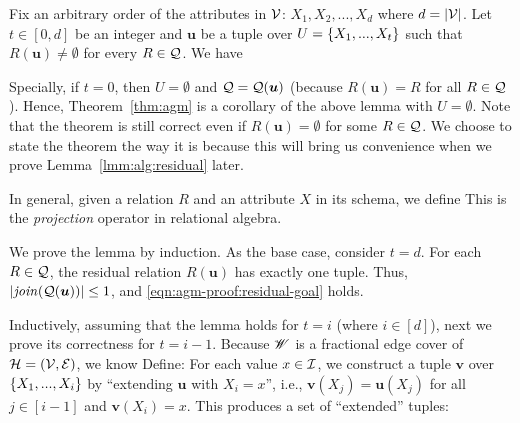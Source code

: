 \vslit

\begin{lemma} \label{lmm:agm-proof:residual}
    Fix an arbitrary order of the attributes in $\mathcal{V}$: $X_1, X_2, ..., X_d$ where $d = |\mathcal{V}|$. Let $t \in [0, d]$ be an integer and $\bm{u}$ be a tuple over $U = \{X_1, ..., X_t\}$ such that $R(\bm{u}) \ne \emptyset$ for every $R \in \mathcal{Q}$. We have
\end{lemma}

\vgap

Specially, if $t = 0$, then $U = \emptyset$ and $\mathcal{Q} = \mathcal{Q}(\textrm{\boldmath${u}$})$ (because $R(\bm{u}) = R$ for all $R \in \mathcal{Q}$). Hence, Theorem~\ref{thm:agm} is a corollary of the above lemma with $U = \emptyset$. Note that the theorem is still correct even if $R(\bm{u}) = \emptyset$ for some $R \in \mathcal{Q}$. We choose to state the theorem the way it is because this will bring us convenience when we prove Lemma~\ref{lmm:alg:residual} later.

 In general, given a relation $R$ and an attribute $X$ in its schema, we define
This is the {\em projection} operator in relational algebra.

\vgap

We prove the lemma by induction. As the base case, consider $t = d$. For each $R \in \mathcal{Q}$, the residual relation $R(\bm{u})$ has exactly one tuple. Thus, $|\mathit{join}(\mathcal{Q}(\textrm{\boldmath${u}$}))| \le 1$, and \eqref{eqn:agm-proof:residual-goal} holds.

\vgap

Inductively, assuming that the lemma holds for $t = i$ (where $i \in [d]$), next we prove its correctness for $t = i - 1$. Because $\mathscr{W}$ is a fractional edge cover of $\mathcal{H} = (\mathcal{V}, \mathcal{E})$, we know
Define:
For each value $x \in \mathcal{I}$, we construct a tuple $\bm{v}$ over $\{X_1, ..., X_i\}$ by ``extending $\bm{u}$ with $X_i = x$'', i.e., $\bm{v}(X_j) = \bm{u}(X_j)$ for all $j \in [i - 1]$ and $\bm{v}(X_i) = x$. This produces a set of ``extended'' tuples:

